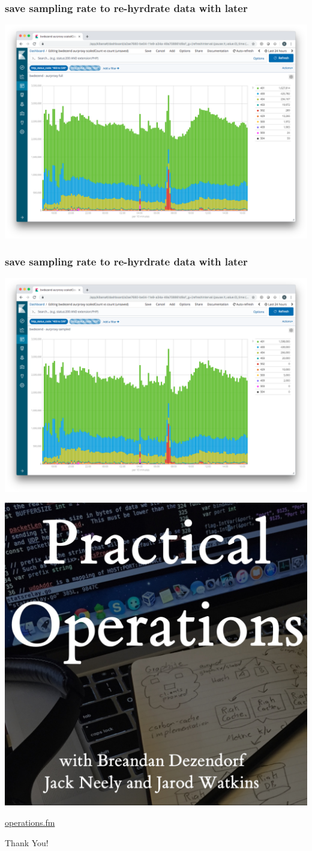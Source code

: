\begin{frame}
    \frametitle{save sampling rate to re-hyrdrate data with later}
    \begin{center}
        \includegraphics[width=0.8\linewidth]{query-full.png}
    \end{center}
\end{frame}

\begin{frame}
    \frametitle{save sampling rate to re-hyrdrate data with later}
    \begin{center}
        \includegraphics[width=0.8\linewidth]{query-sampled.png}
    \end{center}
\end{frame}

\begin{frame}[standout]
    \begin{center}
        \includegraphics[width=0.5\linewidth]{cover-square.jpg}

        \href{https://operations.fm}{operations.fm}
    \end{center}
\end{frame}

\begin{frame}[standout]
    Thank You!
\end{frame}

\appendix


